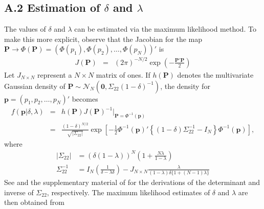 \documentclass[11pt]{article}
\theoremstyle{definition}
\theoremstyle{definition}
\begin{document}
\subsection*{A.2 Estimation of $\delta$ and $\lambda$}


The values of $\delta$ and $\lambda$ can be estimated via the maximum likelihood method. To make this more explicit, observe that the Jacobian for the map $\boldsymbol{P} \to \Phi\left(\boldsymbol{P}\right) = (\Phi(p_1), \Phi(p_2), \dots, \Phi(p_N))'$ is
\begin{eqnarray*}
J(\boldsymbol{P}) &=& (2\pi)^{-N/2} \exp \left( - \frac{\boldsymbol{P}' \boldsymbol{P}}{2}   \right) 
\end{eqnarray*}
%
Let $J_{N \times N}$ represent a $N\times N$ matrix of ones. If $h(\boldsymbol{P})$ denotes the multivariate Gaussian density of $\boldsymbol{P} \sim \mathcal{N}_N\left(\boldsymbol{0}, \Sigma_{22} (1-\delta)^{-1}\right)$,
the density for  $\boldsymbol{p} = (p_1, p_2, \dots, p_N)'$ becomes
\begin{eqnarray*}
 f\left(\boldsymbol{p} | \delta, \lambda \right) &=& h(\boldsymbol{P}) J(\boldsymbol{P})^{-1} \bigg|_{\boldsymbol{P} = \Phi^{-1}(\boldsymbol{p})}\\
&=& \frac{(1-\delta)^{N/2}}{\sqrt{ \left|\Sigma_{22}\right|}} \exp\left[ -\frac{1}{2} \Phi^{-1}(\boldsymbol{p})' \left\{ (1-\delta) \Sigma_{22}^{-1} - I_N \right\} \Phi^{-1}(\boldsymbol{p})  \right],
\end{eqnarray*}
where
\begin{align}
\left| \Sigma_{22}\right| &= (\delta(1- \lambda))^N \left(1+\frac{N \lambda}{1 - \lambda} \right) \nonumber\\
\Sigma_{22}^{-1} &= I_N \left(\frac{1}{\delta-\lambda\delta} \right) - J_{N \times N} \frac{\lambda}{(1-\lambda)\delta\{1+(N-1) \lambda\}} \label{inverse}
\end{align}
See \cite{rao2009linear} and the supplementary material of \cite{dobbin2005sample} for the derivations of the determinant and inverse of $\Sigma_{22}$, respectively. The maximum likelihood estimates of $\delta$ and $\lambda$ are then obtained from
\end{document}
